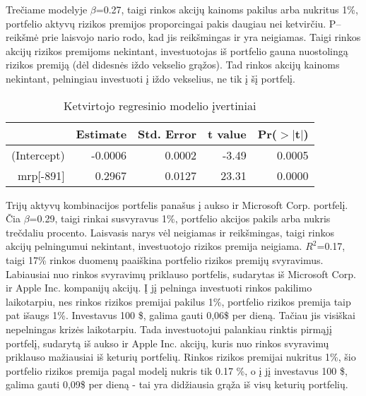 \documentclass[12pt, a14paper, lithuanian]{article}
\begin{document}
Trečiame modelyje $\beta$=0.27, taigi rinkos akcijų kainoms pakilus arba nukritus 1\%, portfelio aktyvų rizikos premijos
proporcingai pakis daugiau nei ketvirčiu. P--reikšmė prie laisvojo nario rodo, kad jis reikšmingas ir yra 
neigiamas. Taigi rinkos akcijų rizikos premijoms nekintant, investuotojas iš portfelio gauna
nuostolingą rizikos premiją (dėl didesnės iždo vekselio grąžos). Tad rinkos akcijų kainoms nekintant,
pelningiau investuoti į iždo vekselius, ne tik į šį portfelį.



\begin{table}[ht]
\begin{center}
\begin{tabular}{rrrrr}
\hline
& Estimate & Std. Error & t value & Pr($>$$|$t$|$) \\
\hline
(Intercept) & -0.0006 & 0.0002 & -3.49 & 0.0005 \\
mrp[-891] & 0.2967 & 0.0127 & 23.31 & 0.0000 \\
\hline
\end{tabular}
\end{center}
\caption{Ketvirtojo regresinio modelio įvertiniai}
\end{table}

Trijų aktyvų kombinacijos portfelis panašus į aukso ir Microsoft Corp. portfelį. Čia $\beta$=0.29, taigi rinkai susvyravus 1\%,
portfelio akcijos pakils arba nukris trečdaliu procento. Laisvasis narys vėl neigiamas ir reikšmingas, taigi
rinkos akcijų pelningumui nekintant, investuotojo rizikos premija neigiama. $R^2$=0.17, taigi 17\% rinkos duomenų
paaiškina portfelio rizikos premijų svyravimus.\\


Labiausiai nuo rinkos svyravimų priklauso portfelis, sudarytas iš Microsoft Corp. ir Apple Inc. kompanijų akcijų. 
Į jį pelninga investuoti rinkos pakilimo laikotarpiu, nes rinkos rizikos premijai pakilus 1\%, portfelio rizikos premija
taip pat išaugs 1\%. Investavus 100 \$, galima gauti 0,06\$ per dieną. Tačiau jis visiškai nepelningas krizės 
laikotarpiu. Tada investuotojui palankiau rinktis pirmąjį portfelį, sudarytą iš aukso ir Apple Inc. akcijų, kuris nuo 
rinkos svyravimų priklauso mažiausiai iš keturių portfelių. Rinkos rizikos premijai nukritus 1\%, šio portfelio rizikos 
premija pagal modelį nukris tik 0.17 \%, o į jį investavus 100 \$, galima gauti 0,09\$ per dieną - tai yra didžiausia 
grąža iš visų keturių portfelių.



\pagebreak
\end{document}
